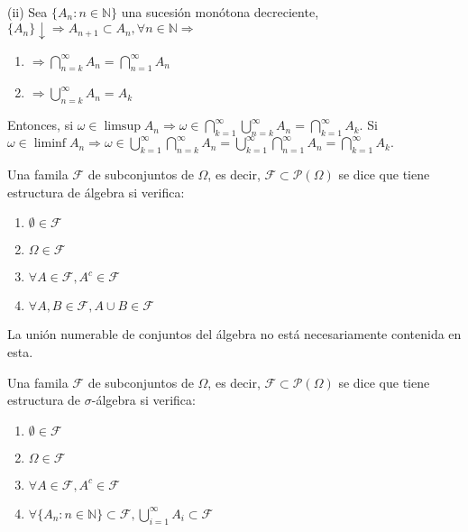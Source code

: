 \begin{dem}(ii) Sea $\{A_n: n\in\mathbb{N}\}$ una sucesión monótona decreciente,
    $\{A_n\}\downarrow \Rightarrow A_{n+1} \subset A_{n}, \forall n\in\mathbb{N} \Rightarrow$
    \begin{enumerate}[label=(\roman*)]
        \item  $\Rightarrow \bigcap_{n=k}^\infty A_n = \bigcap_{n=1}^\infty A_n$
        \item $\Rightarrow \bigcup_{n=k}^\infty A_n = A_k$
    \end{enumerate}
    Entonces, si $\omega\in\limsup A_n \Rightarrow \omega \in \bigcap_{k=1}^\infty \bigcup_{n=k}^\infty A_n = \bigcap_{k=1}^\infty A_k.$ Si $\omega\in\liminf A_n \Rightarrow \omega \in \bigcup_{k=1}^\infty \bigcap_{n=k}^\infty A_n = \bigcup_{k=1}^\infty \bigcap_{n=1}^\infty A_n = \bigcap_{k=1}^\infty A_k.$
\end{dem}

\begin{ejr}

\end{ejr}

\begin{defn}[Álgebra]
Una famila $\mathcal{F}$ de subconjuntos de $\Omega$, es decir, $\mathcal{F}\subset \mathcal{P}(\Omega)$ se dice que tiene estructura de álgebra si verifica:

\begin{enumerate}[label=(\roman*)]
    \item $\emptyset \in \mathcal{F}$
    \item $\Omega \in \mathcal{F}$
    \item $\forall A\in\mathcal{F}, A^c\in\mathcal{F}$
    \item $\forall A,B\in\mathcal{F}, A\cup B \in\mathcal{F}$
\end{enumerate}
\end{defn}

\begin{obs}
La unión numerable de conjuntos del álgebra no está necesariamente contenida en esta.
\end{obs}

\begin{defn}
Una famila $\mathcal{F}$ de subconjuntos de $\Omega$, es decir, $\mathcal{F}\subset \mathcal{P}(\Omega)$ se dice que tiene estructura de $\sigma$-álgebra si verifica:

\begin{enumerate}[label=(\roman*)]
    \item $\emptyset \in \mathcal{F}$
    \item $\Omega \in \mathcal{F}$
    \item $\forall A\in\mathcal{F}, A^c\in\mathcal{F}$
    \item $\forall \{A_n: n\in\mathbb{N}\}\subset\mathcal{F}, \bigcup_{i=1}^\infty A_i \subset\mathcal{F}$
\end{enumerate}
\end{defn}

